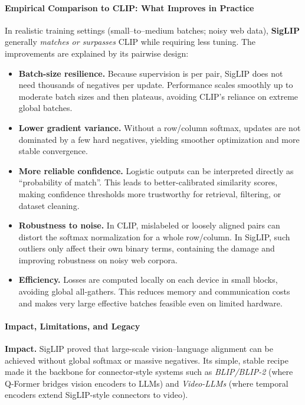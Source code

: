 \begin{enrichment}
\begin{enrichment}
        \paragraph{Empirical Comparison to CLIP: What Improves in Practice}
        In realistic training settings (small–to–medium batches; noisy web data), \textbf{SigLIP} generally \emph{matches or surpasses} CLIP while requiring less tuning. The improvements are explained by its pairwise design:
        \begin{itemize}
            \item \textbf{Batch-size resilience.} Because supervision is per pair, SigLIP does not need thousands of negatives per update. Performance scales smoothly up to moderate batch sizes and then plateaus, avoiding CLIP’s reliance on extreme global batches.
            \item \textbf{Lower gradient variance.} Without a row/column softmax, updates are not dominated by a few hard negatives, yielding smoother optimization and more stable convergence.
            \item \textbf{More reliable confidence.} Logistic outputs can be interpreted directly as “probability of match”. This leads to better-calibrated similarity scores, making confidence thresholds more trustworthy for retrieval, filtering, or dataset cleaning.
            \item \textbf{Robustness to noise.} In CLIP, mislabeled or loosely aligned pairs can distort the softmax normalization for a whole row/column. In SigLIP, such outliers only affect their own binary terms, containing the damage and improving robustness on noisy web corpora.
            \item \textbf{Efficiency.} Losses are computed locally on each device in small blocks, avoiding global all-gathers. This reduces memory and communication costs and makes very large effective batches feasible even on limited hardware.
        \end{itemize}
        
        \paragraph{Impact, Limitations, and Legacy}
        \textbf{Impact.} SigLIP proved that large-scale vision–language alignment can be achieved without global softmax or massive negatives. Its simple, stable recipe made it the backbone for connector-style systems such as \emph{BLIP/BLIP-2} (where Q-Former bridges vision encoders to LLMs) and \emph{Video-LLMs} (where temporal encoders extend SigLIP-style connectors to video).
        

\end{enrichment}
\end{enrichment}
